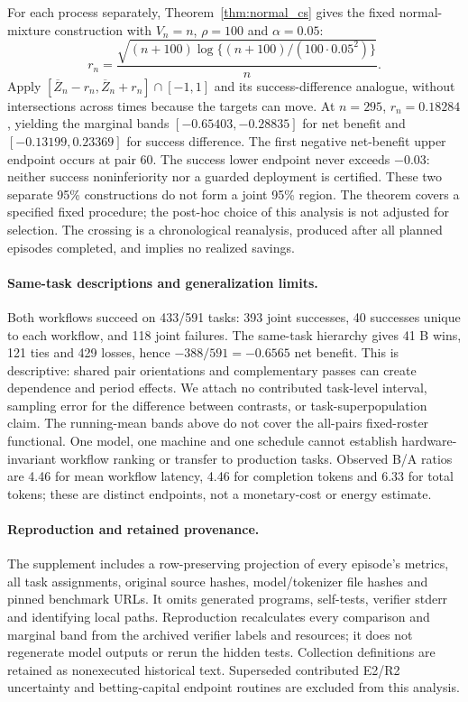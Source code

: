 For each process separately, Theorem~\ref{thm:normal_cs} gives the fixed
normal-mixture construction with $V_n=n$, $\rho=100$ and $\alpha=0.05$:
\[
r_n=\frac{\sqrt{(n+100)\log\{(n+100)/(100\cdot0.05^2)\}}}{n}.
\]
Apply $[\overline Z_n-r_n,\overline Z_n+r_n]\cap[-1,1]$ and its
success-difference analogue, without intersections across times because
the targets can move. At $n=295$, $r_n=0.18284$, yielding the marginal
bands $[-0.65403,-0.28835]$ for net benefit and
$[-0.13199,0.23369]$ for success difference. The first negative
net-benefit upper endpoint occurs at pair 60. The success lower endpoint
never exceeds $-0.03$: neither success noninferiority nor a guarded
deployment is certified. These two separate 95\% constructions do not
form a joint 95\% region. The theorem covers a specified fixed procedure;
the post-hoc choice of this analysis is not adjusted for selection.
The crossing is a chronological reanalysis, produced after all planned
episodes completed, and implies no realized savings.

\paragraph{Same-task descriptions and generalization limits.}
Both workflows succeed on 433/591 tasks: 393 joint successes, 40
successes unique to each workflow, and 118 joint failures. The
same-task hierarchy gives 41 B wins, 121 ties and 429 losses, hence
$-388/591=-0.6565$ net benefit. This is descriptive: shared pair
orientations and complementary passes can create dependence and period
effects. We attach no contributed task-level interval, sampling error for
the difference between contrasts, or task-superpopulation claim.
The running-mean bands above do not cover the all-pairs fixed-roster
functional. One model, one machine and one schedule cannot establish
hardware-invariant workflow ranking or transfer to production tasks.
Observed B/A ratios are 4.46 for mean workflow latency, 4.46 for
completion tokens and 6.33 for total tokens; these are distinct endpoints,
not a monetary-cost or energy estimate.

\paragraph{Reproduction and retained provenance.}
The supplement includes a row-preserving projection of every episode's
metrics, all task assignments, original source hashes, model/tokenizer
file hashes and pinned benchmark URLs. It omits generated programs,
self-tests, verifier stderr and identifying local paths. Reproduction
recalculates every comparison and marginal band from the archived
verifier labels and resources; it does not regenerate model outputs or
rerun the hidden tests. Collection definitions are retained as
nonexecuted historical text. Superseded contributed E2/R2 uncertainty and
betting-capital endpoint routines are excluded from this analysis.
